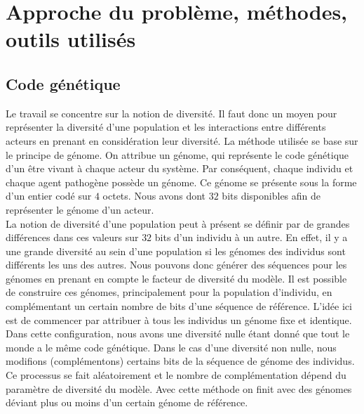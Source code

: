 \chapter{Approche du problème, méthodes, outils utilisés} \label{ch:intro}



\section{Code génétique}
Le travail se concentre sur la notion de diversité. Il faut donc un moyen pour représenter la diversité d'une population et les interactions entre différents acteurs en prenant en considération leur diversité. La méthode utilisée se base sur le principe de génome. On attribue un génome, qui représente le code génétique d'un être vivant à chaque acteur du système. Par conséquent, chaque individu et chaque agent pathogène possède un génome. Ce génome se présente sous la forme d'un entier codé sur $4$ octets. Nous avons dont $32$ bits disponibles afin de représenter le génome d'un acteur.\\ 

La notion de diversité d'une population peut à présent se définir par de grandes différences dans ces valeurs sur $32$ bits d'un individu à un autre. En effet, il y a une grande diversité au sein d'une population si les génomes des individus sont différents les uns des autres. Nous pouvons donc générer des séquences pour les génomes en prenant en compte le facteur de diversité du modèle. Il est possible de construire ces génomes, principalement pour la population d'individu, en complémentant un certain nombre de bits d'une séquence de référence. L'idée ici est de commencer par attribuer à tous les individus un génome fixe et identique. Dans cette configuration, nous avons une diversité nulle étant donné que tout le monde a le même code génétique. Dans le cas d'une diversité non nulle, nous modifions (complémentons) certains bits de la séquence de génome des individus. Ce processus se fait aléatoirement et le nombre de complémentation dépend du paramètre de diversité du modèle. Avec cette méthode on finit avec des génomes déviant plus ou moins d'un certain génome de référence.\\


